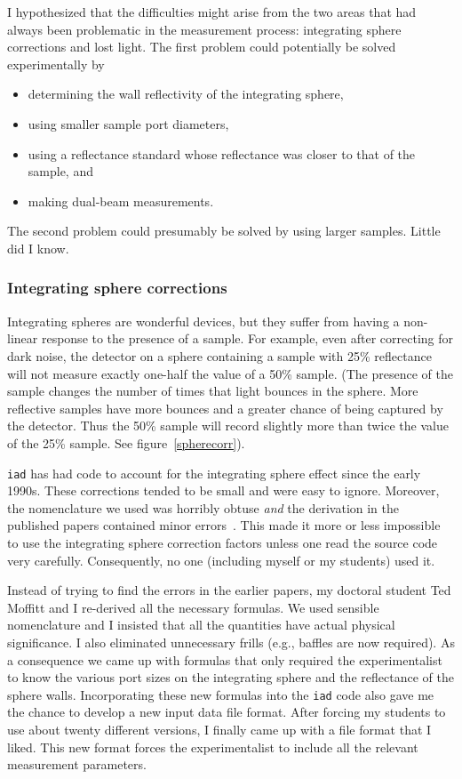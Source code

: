 \documentclass{article}
\newcommand\iadprog{\texttt{iad}}
\begin{document}
I hypothesized that the difficulties might arise from the two areas that had
always been problematic in the measurement process: integrating sphere corrections and lost light.
The first problem could potentially be solved experimentally by 
\begin{itemize}
\item determining the wall reflectivity of the integrating sphere, 
\item using smaller sample port diameters, 
\item using a reflectance standard whose reflectance was closer to that of the sample, and
\item making dual-beam measurements.
\end{itemize}
The second problem could presumably be solved
by using larger samples.  Little did I know.

\subsubsection*{Integrating sphere corrections}

Integrating spheres are wonderful devices, but 
they suffer from having a non-linear response to the presence of a sample.  For
example, even after correcting for dark noise, the detector on a sphere 
containing a sample with 25\% reflectance will not measure exactly one-half 
the value of a 50\% sample. (The presence of the sample changes the number
of times that light bounces in the sphere.  More reflective samples have
more bounces and a greater chance of being captured by the detector.  Thus
the 50\% sample will record slightly more than twice the value of the
25\% sample.  See figure~\ref{spherecorr}).

\iadprog{} has had code to account for the integrating sphere effect since
the early 1990s.  These
corrections tended to be small and were easy to ignore.  Moreover,
the nomenclature we used was horribly obtuse \textit{and} the derivation in the published
papers contained minor errors~\cite{pickering93a}.  This made it more or less impossible
to use the integrating sphere correction factors unless one read the source
code very carefully.  Consequently, no one (including myself or my students)
used it.  

Instead of trying to find the errors in the earlier papers, my doctoral
student Ted Moffitt and I re-derived all the necessary formulas.  We used
sensible nomenclature and I insisted that all the quantities have actual
physical significance.  I also eliminated unnecessary frills (e.g., baffles
are now required).  As a consequence we came up with formulas that 
only required the experimentalist to know the various port sizes on the
integrating sphere and the reflectance of the sphere walls.  
Incorporating these new formulas into the \iadprog{} code also gave me the chance
to develop a new input data file format.  After forcing my students to use about 
twenty different versions,
I finally came up with a file format that I liked.  This new format forces
the experimentalist to include all the relevant measurement parameters.  
\end{document}
